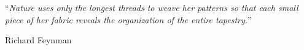 \documentclass[
11pt, %
english, %
singlespacing, %
headsepline, %
]{main} %
\begin{document}

%
%
%
%
%


\vspace*{0.2\textheight}

\noindent\enquote{\itshape Nature uses only the longest threads to weave her patterns so that each small piece of her fabric reveals the organization of the entire tapestry.}\bigbreak

\hfill Richard Feynman
\end{document}
